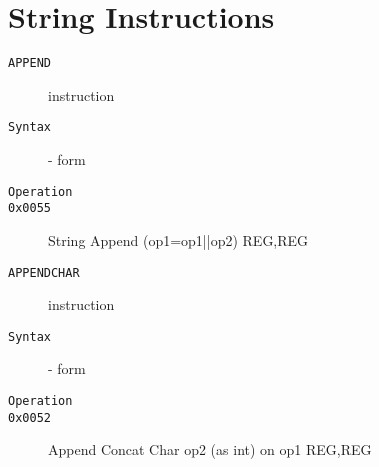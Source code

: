\section{String Instructions}
\begin{description}
\item[\texttt{APPEND}] instruction\\
\item[\texttt{Syntax}] - form \\

\item[\texttt{Operation}]
\item[\texttt{}]
\item[\texttt{0x0055}] String Append (op1=op1||op2)  {REG,REG}           \\
\end{description}
\clearpage
\begin{description}
\item[\texttt{APPENDCHAR}] instruction\\
\item[\texttt{Syntax}] - form \\

\item[\texttt{Operation}]
\item[\texttt{}]
\item[\texttt{0x0052}] Append Concat Char op2 (as int) on op1  {REG,REG}           \\
\end{description}
\clearpage
